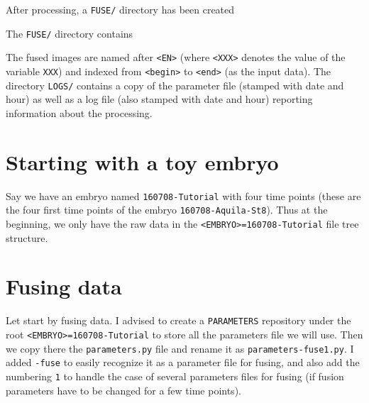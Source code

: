 After processing, a \texttt{FUSE/} directory has been created

\mbox{}
\mbox{}

The \texttt{FUSE/} directory contains 
\mbox{}
\mbox{}

The fused images are named after \texttt{<EN>} (where \texttt{<XXX>}
denotes the value of the variable \texttt{XXX}) and indexed from
\texttt{<begin>} to \texttt{<end>} (as the input data). The directory \texttt{LOGS/} contains
a copy of the parameter file (stamped with date and hour) as well as a
log file (also stamped with date and hour) reporting information about
the processing.






\section{Starting with a toy embryo}

Say we have an embryo named \texttt{160708-Tutorial} with four time points (these are the four first time points of the embryo \texttt{160708-Aquila-St8}). Thus at the beginning, we only have the raw data in the \texttt{<EMBRYO>=160708-Tutorial} file tree structure.










\section{Fusing data}

Let start by fusing data. I advised to create a \texttt{PARAMETERS} repository under the root \texttt{<EMBRYO>=160708-Tutorial} to store all the parameters file we will use. Then we copy there the \texttt{parameters.py} file and rename it as \texttt{parameters-fuse1.py}. I added \texttt{-fuse} to easily recognize it as a parameter file for fusing, and also add the numbering \texttt{1} to handle the case of several parameters files for fusing (if fusion parameters have to be changed for a few time points).

